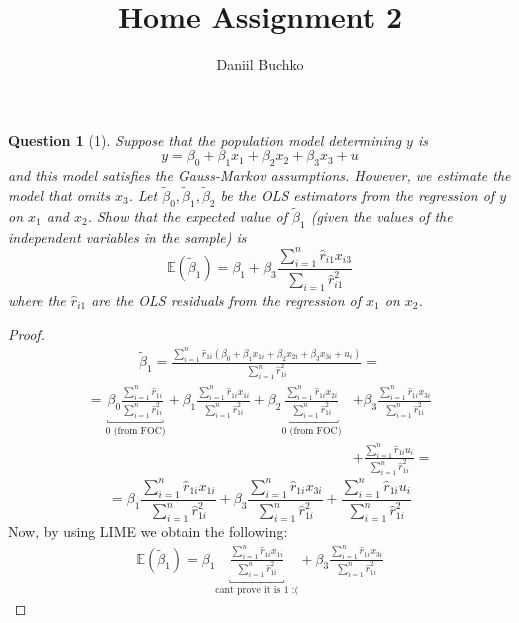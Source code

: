\documentclass[12pt,reqno]{amsart}
\title{Home Assignment 2}
\author{Daniil Buchko}
\theoremstyle{plain}
\newcommand{\E}{\mathbb{E}}
\newcommand{\tb}{\tilde\beta}
\newtheorem*{theorem*}{Question}
\begin{document}
\maketitle
\begin{theorem*}[1]
    \normalfont
    Suppose that the population model determining $ y $ is
    \[
        y = \beta_0 + \beta_{1} x_{1} + \beta_{2}x_{2} + \beta_{3}x_{3} + u
    \]
    and this model satisfies the Gauss-Markov assumptions. However, we estimate the model that
    omits $ x_{3} $. Let $ \tilde\beta_{0}, \tb_{1}, \tb_{2} $ be the OLS estimators from the regression of
    $ y $ on $ x_{1} $ and $ x_{2} $. Show that the expected value of $ \tb_{1} $  (given the values
    of the independent variables in the sample) is
    \[
        \E ( \tb_1 ) = \beta_{1} + \beta_{3}\frac{\sum_{i=1}^{n}\hat{r}_{i1}x_{i3}}{\sum_{i=1}\hat{r}_{i1}^{2}  }
    \]
    where the $ \hat{r}_{i1} $  are the OLS residuals from the regression of $ x_{1} $ on $ x_{2} $.
\end{theorem*}
\begin{proof}
    \begin{gather*}
        \tb_{1} = \frac{\sum_{i=1}^{n} \hat{r}_{1i}(\beta_{0} + \beta_{1}x_{1i} + \beta_{2}x_{2i}+ \beta_{3}x_{3i} + u_{i})}{\sum_{i=1}^{n} \hat{r}^{2}_{1i}} =
    \end{gather*}
    \begin{align*}
        = \underbracket{\beta_{0}\frac{\sum_{i=1}^{n} \hat{r}_{1i}}{\sum_{i=1}^{n} \hat{r}^{2}_{1i}}}_{\text{0 (from FOC)}}
        + \beta_{1}\frac{\sum_{i=1}^{n} \hat{r}_{1i}x_{1i}}{\sum_{i=1}^{n} \hat{r}^{2}_{1i}}
        +  \beta_{2}\underbracket{\frac{\sum_{i=1}^{n} \hat{r}_{1i}x_{2i}}{\sum_{i=1}^{n} \hat{r}^{2}_{1i}}}_{\text{0 (from FOC)}}
         & +\beta_{3}\frac{\sum_{i=1}^{n} \hat{r}_{1i}x_{3i}}{\sum_{i=1}^{n} \hat{r}^{2}_{1i}} \\
         & +\frac{\sum_{i=1}^{n} \hat{r}_{1i}u_{i}}{\sum_{i=1}^{n} \hat{r}^{2}_{1i}} =
    \end{align*}
    \[=\beta_{1}\frac{\sum_{i=1}^{n} \hat{r}_{1i}x_{1i}}{\sum_{i=1}^{n} \hat{r}^{2}_{1i}} + \beta_{3}\frac{\sum_{i=1}^{n} \hat{r}_{1i}x_{3i}}{\sum_{i=1}^{n} \hat{r}^{2}_{1i}} + \frac{\sum_{i=1}^{n} \hat{r}_{1i}u_{i}}{\sum_{i=1}^{n} \hat{r}^{2}_{1i}}\]
    Now, by using LIME we obtain the following:
    \begin{gather*}
        \E(\tb_{1}) = \beta_{1}\underbracket{\frac{\sum_{i=1}^{n} \hat{r}_{1i}x_{1i}}{\sum_{i=1}^{n} \hat{r}^{2}_{1i} }}_{\text{cant prove it is 1 :(}}
        +  \beta_{3}\frac{\sum_{i=1}^{n} \hat{r}_{1i}x_{3i}}{\sum_{i=1}^{n} \hat{r}^{2}_{1i}}
    \end{gather*}
\end{proof}
\end{document}
